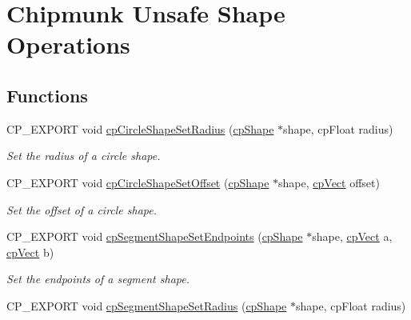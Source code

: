 \hypertarget{group__unsafe}{}\section{Chipmunk Unsafe Shape Operations}
\label{group__unsafe}
\subsection*{Functions}
\begin{DoxyCompactItemize}
\item 
\mbox{\label{group__unsafe_ga3e15a724d3181b3a896816e9eeaadc40}} 
C\+P\+\_\+\+E\+X\+P\+O\+RT void \hyperlink{group__unsafe_ga3e15a724d3181b3a896816e9eeaadc40}{cp\+Circle\+Shape\+Set\+Radius} (\hyperlink{structcpShape}{cp\+Shape} $\ast$shape, cp\+Float radius)
\begin{DoxyCompactList}\small\item\em Set the radius of a circle shape. \end{DoxyCompactList}\item 
\mbox{\label{group__unsafe_gad10b3edd28599778cc1109b0105bbd8a}} 
C\+P\+\_\+\+E\+X\+P\+O\+RT void \hyperlink{group__unsafe_gad10b3edd28599778cc1109b0105bbd8a}{cp\+Circle\+Shape\+Set\+Offset} (\hyperlink{structcpShape}{cp\+Shape} $\ast$shape, \hyperlink{structcpVect}{cp\+Vect} offset)
\begin{DoxyCompactList}\small\item\em Set the offset of a circle shape. \end{DoxyCompactList}\item 
\mbox{\label{group__unsafe_gaf88e902637a060c22763fd8821ae3344}} 
C\+P\+\_\+\+E\+X\+P\+O\+RT void \hyperlink{group__unsafe_gaf88e902637a060c22763fd8821ae3344}{cp\+Segment\+Shape\+Set\+Endpoints} (\hyperlink{structcpShape}{cp\+Shape} $\ast$shape, \hyperlink{structcpVect}{cp\+Vect} a, \hyperlink{structcpVect}{cp\+Vect} b)
\begin{DoxyCompactList}\small\item\em Set the endpoints of a segment shape. \end{DoxyCompactList}\item 
\mbox{\label{group__unsafe_ga712a6fe0c9b1f3a4f4c32cacb56485c7}} 
C\+P\+\_\+\+E\+X\+P\+O\+RT void \hyperlink{group__unsafe_ga712a6fe0c9b1f3a4f4c32cacb56485c7}{cp\+Segment\+Shape\+Set\+Radius} (\hyperlink{structcpShape}{cp\+Shape} $\ast$shape, cp\+Float radius)

\end{DoxyCompactItemize}
